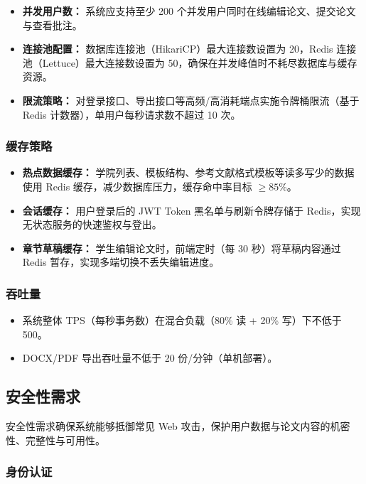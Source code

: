 \documentclass{../../softeng}
\begin{document}
{\begin{itemize}
    \item \textbf{并发用户数：} 系统应支持至少 200 个并发用户同时在线编辑论文、提交论文与查看批注。
    \item \textbf{连接池配置：} 数据库连接池（HikariCP）最大连接数设置为 20，Redis 连接池（Lettuce）最大连接数设置为 50，确保在并发峰值时不耗尽数据库与缓存资源。
    \item \textbf{限流策略：} 对登录接口、导出接口等高频/高消耗端点实施令牌桶限流（基于 Redis 计数器），单用户每秒请求数不超过 10 次。
\end{itemize}

\subsubsection{缓存策略}

\begin{itemize}
    \item \textbf{热点数据缓存：} 学院列表、模板结构、参考文献格式模板等读多写少的数据使用 Redis 缓存，减少数据库压力，缓存命中率目标 $\ge 85\%$。
    \item \textbf{会话缓存：} 用户登录后的 JWT Token 黑名单与刷新令牌存储于 Redis，实现无状态服务的快速鉴权与登出。
    \item \textbf{章节草稿缓存：} 学生编辑论文时，前端定时（每 30 秒）将草稿内容通过 Redis 暂存，实现多端切换不丢失编辑进度。
\end{itemize}

\subsubsection{吞吐量}

\begin{itemize}
    \item 系统整体 TPS（每秒事务数）在混合负载（80\% 读 + 20\% 写）下不低于 500。
    \item DOCX/PDF 导出吞吐量不低于 20 份/分钟（单机部署）。
\end{itemize}

\subsection{安全性需求}

安全性需求确保系统能够抵御常见 Web 攻击，保护用户数据与论文内容的机密性、完整性与可用性。

\subsubsection{身份认证}

}
\end{document}
